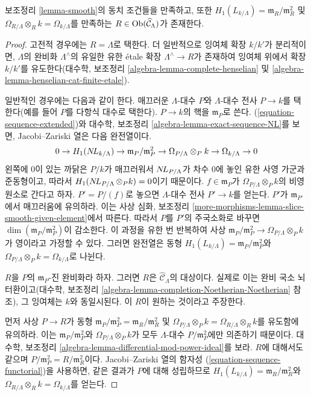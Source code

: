 \begin{lemma}
\label{lemma-exists-smooth}
보조정리 \ref{lemma-smooth}의 동치 조건들을 만족하고, 또한
$H_1(L_{k/\Lambda}) = \mathfrak m_R/\mathfrak m_R^2$ 및
$\Omega_{R/\Lambda} \otimes_R k = \Omega_{k/\Lambda}$를 만족하는
$R \in \mathop{\mathrm{Ob}}\nolimits(\widehat{\mathcal{C}}_\Lambda)$가 존재한다.
\end{lemma}

\begin{proof}
고전적 경우에는 $R = \Lambda$로 택한다. 더 일반적으로 잉여체 확장
$k/k'$가 분리적이면, $\Lambda$의 완비화 $\Lambda^\wedge$의 유일한
유한 \'etale 확장 $\Lambda^\wedge \to R$가 존재하여 잉여체 위에서
확장 $k/k'$를 유도한다(대수학, 보조정리
\ref{algebra-lemma-complete-henselian} 및
\ref{algebra-lemma-henselian-cat-finite-etale}).

\medskip\noindent
일반적인 경우에는 다음과 같이 한다. 매끄러운 $\Lambda$-대수 $P$와
$\Lambda$-대수 전사 $P \to k$를 택한다(예를 들어 $P$를 다항식
대수로 택한다). $P \to k$의 핵을 $\mathfrak m_P$로 쓴다.
(\ref{equation-sequence-extended})와 대수학, 보조정리
\ref{algebra-lemma-exact-sequence-NL}를 보면, Jacobi--Zariski 열은
다음 완전열이다.
$$
0 \to H_1(\mathop{N\!L}\nolimits_{k/\Lambda}) \to
\mathfrak m_P/\mathfrak m_P^2 \to
\Omega_{P/\Lambda} \otimes_P k \to
\Omega_{k/\Lambda} \to 0
$$
왼쪽에 $0$이 있는 까닭은 $P/k$가 매끄러워서%
$\mathop{N\!L}\nolimits_{P/\Lambda}$가 차수 $0$에 놓인 유한 사영 가군과 준동형이고,
따라서 $H_1(\mathop{N\!L}\nolimits_{P/\Lambda} \otimes_P k) = 0$이기 때문이다.
$f \in \mathfrak m_P$가 $\Omega_{P/\Lambda} \otimes_P k$의
비영 원소로 간다고 하자. $P' = P/(f)$로 놓으면
$\Lambda$-대수 전사 $P' \to k$를 얻는다. $P'$가
$\mathfrak m_{P'}$에서 매끄러움에 유의하라. 이는 사상 심화,
보조정리 \ref{more-morphisms-lemma-slice-smooth-given-element}에서 따른다.
따라서 $P$를 $P'$의 주국소화로 바꾸면
$\dim(\mathfrak m_P/\mathfrak m_P^2)$이 감소한다. 이 과정을 유한 번
반복하여 사상 $\mathfrak m_P/\mathfrak m_P^2 \to
\Omega_{P/\Lambda} \otimes_P k$가 영이라고 가정할 수 있다. 그러면
완전열은 동형
$H_1(L_{k/\Lambda}) = \mathfrak m_P/\mathfrak m_P^2$와
$\Omega_{P/\Lambda} \otimes_P k = \Omega_{k/\Lambda}$로 나뉜다.

\medskip\noindent
$R$을 $P$의 $\mathfrak m_P$-진 완비화라 하자. 그러면 $R$은
$\widehat{\mathcal{C}}_\Lambda$의 대상이다. 실제로 이는 완비 국소
뇌터환이고(대수학, 보조정리
\ref{algebra-lemma-completion-Noetherian-Noetherian} 참조), 그 잉여체는
$k$와 동일시된다. 이 $R$이 원하는 것이라고 주장한다.

\medskip\noindent
먼저 사상 $P \to R$가 동형
$\mathfrak m_P/\mathfrak m_P^2 = \mathfrak m_R/\mathfrak m_R^2$ 및
$\Omega_{P/\Lambda} \otimes_P k = \Omega_{R/\Lambda} \otimes_R k$를
유도함에 유의하라. 이는 $\mathfrak m_P/\mathfrak m_P^2$와
$\Omega_{P/\Lambda} \otimes_P k$가 모두 $\Lambda$-대수
$P/\mathfrak m_P^2$에만 의존하기 때문이다. 대수학, 보조정리
\ref{algebra-lemma-differential-mod-power-ideal}를 보라. $R$에 대해서도
같으며 $P/\mathfrak m_P^2 = R/\mathfrak m_R^2$이다.
Jacobi--Zariski 열의 함자성
(\ref{equation-sequence-functorial})을 사용하면, 같은 결과가 $P$에 대해
성립하므로 $H_1(L_{k/\Lambda}) = \mathfrak m_R/\mathfrak m_R^2$와
$\Omega_{R/\Lambda} \otimes_R k = \Omega_{k/\Lambda}$를 얻는다.


\end{proof}
